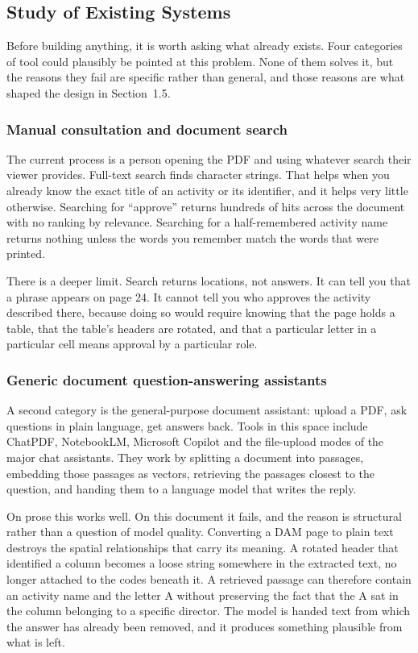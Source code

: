 \subsection{Study of Existing Systems}

Before building anything, it is worth asking what already exists. Four
categories of tool could plausibly be pointed at this problem. None of them
solves it, but the reasons they fail are specific rather than general, and those
reasons are what shaped the design in Section~1.5.

\subsubsection{Manual consultation and document search}

The current process is a person opening the PDF and using whatever search their
viewer provides. Full-text search finds character strings. That helps when you
already know the exact title of an activity or its identifier, and it helps very
little otherwise. Searching for ``approve'' returns hundreds of hits across the
document with no ranking by relevance. Searching for a half-remembered activity
name returns nothing unless the words you remember match the words that were
printed.

There is a deeper limit. Search returns locations, not answers. It can tell you
that a phrase appears on page 24. It cannot tell you who approves the activity
described there, because doing so would require knowing that the page holds a
table, that the table's headers are rotated, and that a particular letter in a
particular cell means approval by a particular role.

\subsubsection{Generic document question-answering assistants}

A second category is the general-purpose document assistant: upload a PDF, ask
questions in plain language, get answers back. Tools in this space include
ChatPDF, NotebookLM, Microsoft Copilot and the file-upload modes of the major
chat assistants. They work by splitting a document into passages, embedding
those passages as vectors, retrieving the passages closest to the question, and
handing them to a language model that writes the reply.

On prose this works well. On this document it fails, and the reason is
structural rather than a question of model quality. Converting a DAM page to
plain text destroys the spatial relationships that carry its meaning. A rotated
header that identified a column becomes a loose string somewhere in the
extracted text, no longer attached to the codes beneath it. A retrieved passage
can therefore contain an activity name and the letter A without preserving the
fact that the A sat in the column belonging to a specific director. The model is
handed text from which the answer has already been removed, and it produces
something plausible from what is left.

